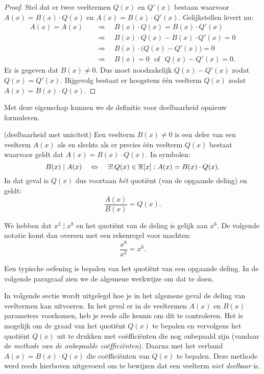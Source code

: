 \documentclass{ximera}
\begin{document}
\begin{proof}

Stel dat er twee veeltermen $Q(x)$ en $Q'(x)$ bestaan waarvoor $A(x) = B(x)\cdot Q(x)$ en $A(x) = B(x)\cdot Q'(x)$. Gelijkstellen levert nu:
\begin{align*}
A(x) = A(x) \quad & \Rightarrow \quad B(x)\cdot Q(x) = B(x)\cdot Q'(x) \\
& \Rightarrow \quad B(x)\cdot Q(x) - B(x)\cdot Q'(x) = 0 \\
& \Rightarrow \quad B(x) \cdot \bigl(Q(x) - Q'(x) \bigr) = 0 \\
& \Rightarrow \quad B(x) = 0 \,\,\text{ of } \,\, Q(x) - Q'(x) = 0. 
\end{align*}
Er is gegeven dat $B(x) \neq 0$. Dus moet noodzakelijk $Q(x) - Q'(x)$ zodat $Q(x) = Q'(x)$. Bijgevolg bestaat er hoogstens één veelterm $Q(x)$ zodat $A(x) = B(x)\cdot Q(x)$.

\end{proof}


Met deze eigenschap kunnen we de definitie voor deelbaarheid opnieuw formuleren. 

\begin{definition}(deelbaarheid met uniciteit)
    Een veelterm $B(x) \neq 0$ is een deler van een veelterm $A(x)$ als en slechts als er precies één veelterm $Q(x)$ bestaat waarvoor geldt dat $A(x) = B(x)\cdot Q(x)$. In symbolen:
    \[
    B(x) \mid A(x) \quad \Leftrightarrow \quad \exists! \, Q(x) \in \mathbb{R}[x]: A(x) = B(x)\cdot Q(x).
    \] 
    In dat geval is $Q(x)$ dus voortaan {\em hét} quotiënt (van de opgaande deling) en geldt: 
    \[
    \frac{A(x)}{B(x)} = Q(x).
    \]
    
\end{definition}

\begin{example} 
We hebben dat $x^2 \mid x^8$ en het quotiënt van de deling is gelijk aan $x^6$. De volgende notatie komt dan overeen met een rekenregel voor machten:
\[
\frac{x^8}{x^2} = x^6.
\]
\end{example} 




Een typische oefening is bepalen van het quotiënt van een opgaande deling. In de volgende paragraaf zien we de algemene werkwijze om dat te doen. 

In volgende sectie wordt uitgelegd hoe je in het algemene geval de deling van veeltermen kan uitvoeren. In het geval er in de veeltermen $A(x)$ en $B(x)$ parameters voorkomen, heb je reeds alle kennis om dit te controleren. Het is mogelijk om de graad van het quotiënt $Q(x)$ te bepalen en vervolgens het quotiënt $Q(x)$ uit te drukken met coëfficiënten die nog onbepaald zijn (vandaar de \textit{methode van de onbepaalde coëfficiënten}). Daarna met het verband $A(x) = B(x) \cdot Q(x)$ die coëfficiënten van $Q(x)$ te bepalen. Deze methode werd reeds hierboven uitgevoerd om te bewijzen dat een veelterm \textit{niet deelbaar} is. 
\end{document}
